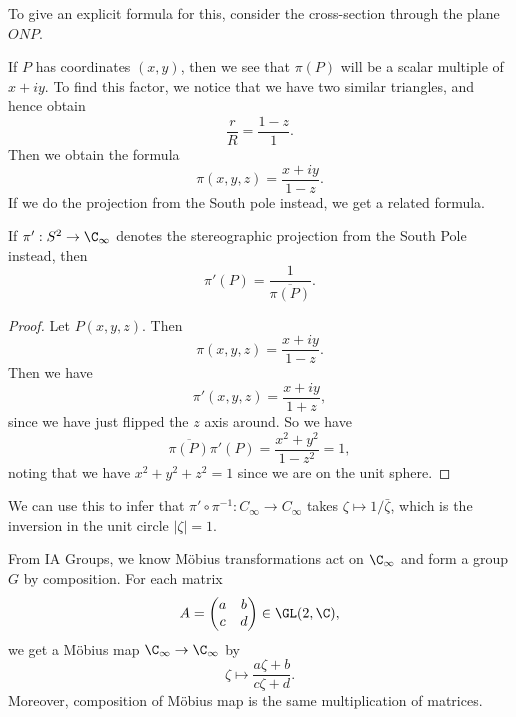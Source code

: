 \documentclass[a4paper]{article}
\begin{document}
To give an explicit formula for this, consider the cross-section through the plane $ONP$.
\begin{center}
\end{center}
If $P$ has coordinates $(x, y)$, then we see that $\pi(P)$ will be a scalar multiple of $x + iy$. To find this factor, we notice that we have two similar triangles, and hence obtain
\[
  \frac{r}{R} = \frac{1 - z}{1}.
\]
Then we obtain the formula
\[
  \pi(x, y, z) = \frac{x + iy}{1 - z}.
\]
If we do the projection from the South pole instead, we get a related formula.
\begin{lemma}
  If $\pi': S^2 \to \C_{\infty}$ denotes the stereographic projection from the South Pole instead, then
  \[
    \pi'(P) = \frac{1}{\overline{\pi(P)}}.
  \]
\end{lemma}

\begin{proof}
  Let $P(x, y, z)$. Then
  \[
    \pi(x, y, z) = \frac{x + iy}{1 - z}.
  \]
  Then we have
  \[
    \pi'(x, y, z) = \frac{x + iy}{1 + z},
  \]
  since we have just flipped the $z$ axis around. So we have
  \[
    \overline{\pi(P)}\pi'(P) = \frac{x^2 + y^2}{1 - z^2} =1,
  \]
  noting that we have $x^2 + y^2 + z^2 = 1$ since we are on the unit sphere.
\end{proof}

We can use this to infer that $\pi' \circ \pi^{-1}: C_{\infty} \to C_{\infty}$ takes $\zeta \mapsto 1/\bar{\zeta}$, which is the inversion in the unit circle $|\zeta| = 1$.

From IA Groups, we know M\"obius transformations act on $\C_{\infty}$ and form a group $G$ by composition. For each matrix
\[
  A =
  \begin{pmatrix}
    a & b\\
    c & d
  \end{pmatrix} \in \GL(2, \C),
\]
we get a M\"obius map $\C_\infty \to \C_\infty$ by
\[
  \zeta \mapsto \frac{a \zeta + b}{c \zeta + d}.
\]
Moreover, composition of M\"obius map is the same multiplication of matrices.
\end{document}
